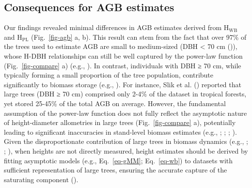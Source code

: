 \documentclass[
  12pt,
  letterpaper,
  DIV=11,
  numbers=noendperiod]{scrartcl}
\begin{document}
\subsection{Consequences for AGB
estimates}\label{consequences-for-agb-estimates}

Our findings revealed minimal differences in AGB estimates derived from
\(\text{H}_\text{WB}\) and \(\text{H}_\text{PL}\) (Fig.~\ref{fig-agb} a,
b). This result can stem from the fact that over 97\% of the trees used
to estimate AGB are small to medium-sized (DBH \textless{} 70 cm
()), whose H-DBH relationships
can still be well captured by the power-law function
(Fig.~\ref{fig-compare} a) (e.g., ). In contrast, individuals with DBH ≥ 70 cm, while typically
forming a small proportion of the tree population, contribute
significantly to biomass storage (e.g., ). For instance, Slik et al. ()
reported that large trees (DBH ≥ 70 cm) comprised only 2-4\% of the
dataset in tropical forests, yet stored 25-45\% of the total AGB on
average. However, the fundamental assumption of the power-law function
does not fully reflect the asymptotic nature of height-diameter
allometries in large trees (Fig.~\ref{fig-compare} a), potentially
leading to significant inaccuracies in stand-level biomass estimates
(e.g., ;
;
;
). Given the
disproportionate contribution of large trees in biomass dynamics (e.g.,
;
;
), when heights are not
directly measured, height estimates should be derived by fitting
asymptotic models (e.g., Eq.~\ref{eq-gMM}; Eq.~\ref{eq-wb}) to datasets
with sufficient representation of large trees, ensuring the accurate
capture of the saturating component
().
\end{document}
